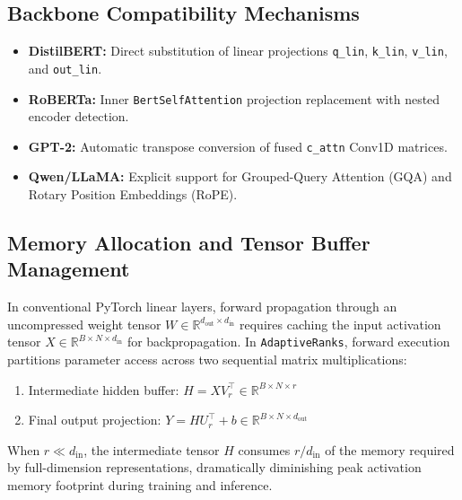 \subsection{Backbone Compatibility Mechanisms}
\begin{itemize}
\item \textbf{DistilBERT:} Direct substitution of linear projections \texttt{q\_lin}, \texttt{k\_lin}, \texttt{v\_lin}, and \texttt{out\_lin}.
\item \textbf{RoBERTa:} Inner \texttt{BertSelfAttention} projection replacement with nested encoder detection.
\item \textbf{GPT-2:} Automatic transpose conversion of fused \texttt{c\_attn} Conv1D matrices.
\item \textbf{Qwen/LLaMA:} Explicit support for Grouped-Query Attention (GQA) and Rotary Position Embeddings (RoPE).
\end{itemize}

\subsection{Memory Allocation and Tensor Buffer Management}
In conventional PyTorch linear layers, forward propagation through an uncompressed weight tensor $W \in \mathbb{R}^{d_{\text{out}} \times d_{\text{in}}}$ requires caching the input activation tensor $X \in \mathbb{R}^{B \times N \times d_{\text{in}}}$ for backpropagation. In \texttt{AdaptiveRanks}, forward execution partitions parameter access across two sequential matrix multiplications:
\begin{enumerate}
\item Intermediate hidden buffer: $H = X V_r^\top \in \mathbb{R}^{B \times N \times r}$
\item Final output projection: $Y = H U_r^\top + b \in \mathbb{R}^{B \times N \times d_{\text{out}}}$
\end{enumerate}
When $r \ll d_{\text{in}}$, the intermediate tensor $H$ consumes $r / d_{\text{in}}$ of the memory required by full-dimension representations, dramatically diminishing peak activation memory footprint during training and inference.

